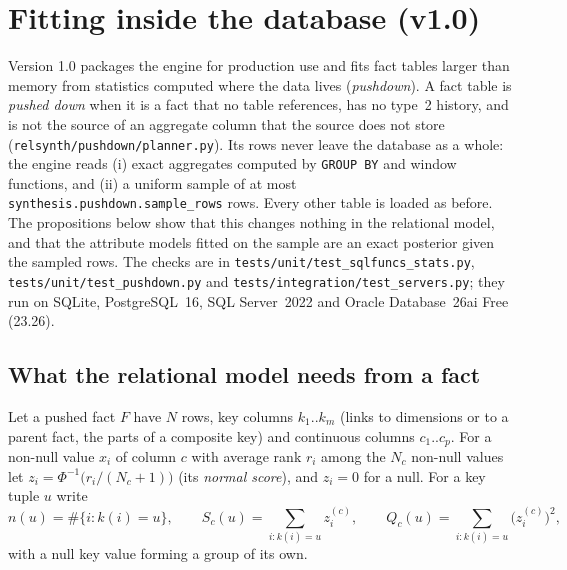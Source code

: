 \section{Fitting inside the database (v1.0)}\label{sec:v10}
Version 1.0 packages the engine for production use and fits fact tables larger than memory from statistics computed where the data lives (\emph{pushdown}). A fact table is \emph{pushed down} when it is a fact that no table references, has no type~2 history, and is not the source of an aggregate column that the source does not store (\texttt{relsynth/pushdown/planner.py}). Its rows never leave the database as a whole: the engine reads (i) exact aggregates computed by \texttt{GROUP BY} and window functions, and (ii) a uniform sample of at most \texttt{synthesis.pushdown.sample\_rows} rows. Every other table is loaded as before. The propositions below show that this changes nothing in the relational model, and that the attribute models fitted on the sample are an exact posterior given the sampled rows. The checks are in \texttt{tests/unit/test\_sqlfuncs\_stats.py}, \texttt{tests/unit/test\_pushdown.py} and \texttt{tests/integration/test\_servers.py}; they run on SQLite, PostgreSQL~16, SQL Server~2022 and Oracle Database~26ai Free (23.26).

\subsection{What the relational model needs from a fact}
Let a pushed fact $F$ have $N$ rows, key columns $k_1..k_m$ (links to dimensions or to a parent fact, the parts of a composite key) and continuous columns $c_1..c_p$. For a non-null value $x_i$ of column $c$ with average rank $r_i$ among the $N_c$ non-null values let $z_i=\Phi^{-1}\bigl(r_i/(N_c+1)\bigr)$ (its \emph{normal score}), and $z_i=0$ for a null. For a key tuple $u$ write
\[n(u)=\#\{i:k(i)=u\},\qquad S_c(u)=\sum_{i:k(i)=u}z_i^{(c)},\qquad Q_c(u)=\sum_{i:k(i)=u}\bigl(z_i^{(c)}\bigr)^2,\]
with a null key value forming a group of its own.

